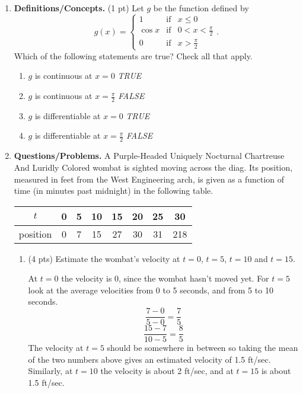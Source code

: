\documentclass[11pt,letterpaper]{article}
\begin{document}
\begin{enumerate}
\item  \textbf{Definitions/Concepts.} (1 pt) 
Let $g$ be the function defined by
\[ g(x)=\left\{\begin{array}{lcl}
              1 & \text{if} & x\leq 0 \\
              \cos x & \text{if} & 0 < x < \frac{\pi}{2} \\
              0 & \text{if} & x > \frac{\pi}{2}
             \end{array}\right..
 \]
Which of the following statements are true? Check all
that apply.
\begin{enumerate}
 \item $g$ is continuous at $x=0$ \emph{TRUE}
 \item $g$ is continuous at $x=\frac{\pi}{2}$ \emph{FALSE}
 \item $g$ is differentiable at $x=0$ \emph{TRUE} 
 \item $g$ is differentiable at $x=\frac{\pi}{2}$ \emph{FALSE}
\end{enumerate}

\vspace{1pc}
\item \textbf{Questions/Problems.} 
\noindent
A Purple-Headed Uniquely Nocturnal Chartreuse And
Luridly Colored
wombat is sighted moving across the diag. Its position,
measured in
feet from the West Engineering arch, is given as a
function of time
(in minutes past midnight) in the following table.
\smallskip
\begin{center}
\begin{tabular}{c|ccccccc}
$t$ & 0 & 5 & 10 & 15 & 20 & 25 & 30 \\
\hline
position & 0 & 7 & 15 & 27 & 30 & 31 & 218
\end{tabular}
\end{center}
\begin{enumerate}
\item (4 pts)
Estimate the wombat's velocity at $t=0$, $t=5$, $t=10$
and $t=15$.

At $t=0$ the velocity is 0, since the wombat hasn't moved yet.  For $t=5$ look at the average velocities from 0 to 5 seconds, and from 5 to 10 seconds.
\[\frac{7-0}{5-0}=\frac{7}{5} \]
\[ \frac{15-7}{10-5}=\frac{8}{5}\]
The velocity at $t=5$ should be somewhere in between so taking the mean of the two numbers above gives an estimated velocity of 1.5 ft/sec.  Similarly, at $t=10$ the velocity is about 2 ft/sec, and at $t=15$ is about 1.5 ft/sec.


\end{enumerate}
\end{enumerate}
\end{document}
